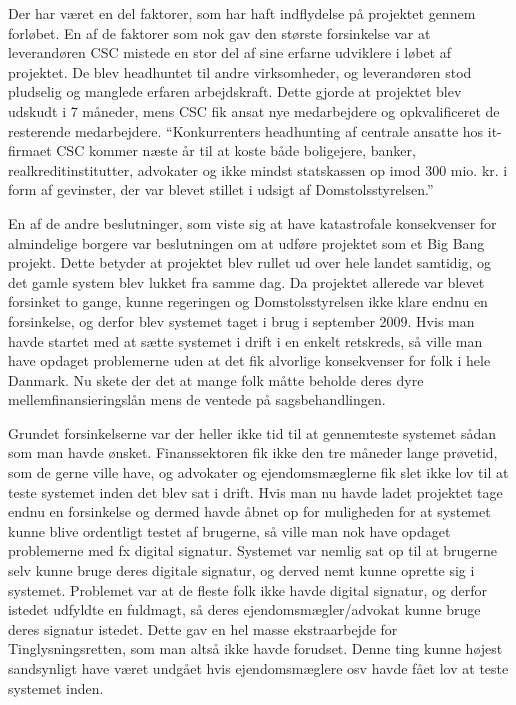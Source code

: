 \documentclass[10pt,a4paper,danish]{article}
\begin{document}
Der har været en del faktorer, som har haft indflydelse på projektet gennem forløbet. En af de faktorer som nok gav den største forsinkelse var at leverandøren CSC mistede en stor del af sine erfarne udviklere i løbet af projektet. De blev headhuntet til andre virksomheder, og leverandøren stod pludselig og manglede erfaren arbejdskraft. Dette gjorde at projektet blev udskudt i 7 måneder, mens CSC fik ansat nye medarbejdere og opkvalificeret de resterende medarbejdere. 
"`Konkurrenters headhunting af centrale ansatte hos it-firmaet CSC kommer næste år til at koste både boligejere, banker, realkreditinstitutter, advokater og ikke mindst statskassen op imod 300 mio. kr. i form af gevinster, der var blevet stillet i udsigt af Domstolsstyrelsen."'\cite{Epn}
 
En af de andre beslutninger, som viste sig at have katastrofale konsekvenser for almindelige borgere var beslutningen om at udføre projektet som et Big Bang projekt. Dette betyder at projektet blev rullet ud over hele landet samtidig, og det gamle system blev lukket fra samme dag. Da projektet allerede var blevet forsinket to gange, kunne regeringen og Domstolsstyrelsen ikke klare endnu en forsinkelse, og derfor blev systemet taget i brug i september 2009. Hvis man havde startet med at sætte systemet i drift i en enkelt retskreds, så ville man have opdaget problemerne uden at det fik alvorlige konsekvenser for folk i hele Danmark. Nu skete der det at mange folk måtte beholde deres dyre mellemfinansieringslån mens de ventede på sagsbehandlingen.

Grundet forsinkelserne var der heller ikke tid til at gennemteste systemet sådan som man havde ønsket. Finanssektoren fik ikke den tre måneder lange prøvetid, som de gerne ville have\cite{Inf}, og advokater og ejendomsmæglerne fik slet ikke lov til at teste systemet inden det blev sat i drift. Hvis man nu havde ladet projektet tage endnu en forsinkelse og dermed havde åbnet op for muligheden for at systemet kunne blive ordentligt testet af brugerne, så ville man nok have opdaget problemerne med fx digital signatur. Systemet var nemlig sat op til at brugerne selv kunne bruge deres digitale signatur, og derved nemt kunne oprette sig i systemet. Problemet var at de fleste folk ikke havde digital signatur, og derfor istedet udfyldte en fuldmagt, så deres ejendomsmægler/advokat kunne bruge deres signatur istedet. Dette gav en hel masse ekstraarbejde for Tinglysningsretten, som man altså ikke havde forudset. Denne ting kunne højest sandsynligt have været undgået hvis ejendomsmæglere osv havde fået lov at teste systemet inden.
\end{document}
